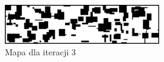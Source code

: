 \documentclass[12pt,twoside]{article}
\begin{document}
%
%    

\begin{figure}[ht]
    \centering
    \includegraphics[width=0.6\textwidth]{figures/static_algo/map_3.png}
    \caption{Mapa dla iteracji 3}
    \label{fig:map_3}
\end{figure}
\end{document}
